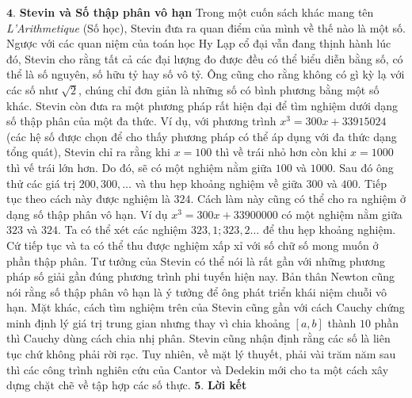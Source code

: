 \begin{multicols}{2}
	\vskip 0.1cm
	$\pmb{4.}$ \textbf{\color{toanhocdoisong}Stevin và Số thập phân vô hạn}
	\vskip 0.1cm
	Trong một cuốn sách khác mang tên \textit{L'Arithmetique} (Số học), Stevin đưa ra quan điểm của mình về thế nào là một số. Ngược với các quan niệm của toán học Hy Lạp cổ đại vẫn đang thịnh hành lúc đó, Stevin cho rằng tất cả các đại lượng đo được đều có thể biểu diễn bằng số, có thể là số nguyên, số hữu tỷ hay số vô tỷ. Ông cũng cho rằng không có gì kỳ lạ với các số như $\sqrt{2}$, chúng chỉ đơn giản là những số có bình phương bằng một số khác. 
	\vskip 0.1cm
	Stevin còn đưa ra một phương pháp rất hiện đại để tìm nghiệm dưới dạng số thập phân của một đa thức. Ví dụ, với phương trình $x^3=300x+33915024$ (các hệ số được chọn để cho thấy phương pháp có thể áp dụng với đa thức dạng tổng quát), Stevin chỉ ra rằng khi $x=100$ thì về trái nhỏ hơn còn khi $x=1000$ thì vế trái lớn hơn. Do đó, sẽ có một nghiệm nằm giữa $100$ và $1000$. Sau đó ông thử các giá trị $200, 300, \ldots$ và thu hẹp khoảng nghiệm về giữa $300$ và $400$. Tiếp tục theo cách này được nghiệm là $324$. Cách làm này cũng có thể cho ra nghiệm ở dạng số thập phân vô hạn. Ví dụ $x^3=300x+33900000$ có một nghiệm nằm giữa $323$ và $324$. Ta có thể xét các nghiệm $323,1; 323,2 \ldots$ để thu hẹp khoảng nghiệm. Cứ tiếp tục và ta có thể thu được nghiệm xấp xỉ với số chữ số mong muốn ở phần thập phân. Tư tưởng của Stevin có thể nói là rất gần với những phương pháp số giải gần đúng phương trình phi tuyến hiện nay.
	\vskip 0.1cm
	Bản thân Newton cũng nói rằng số thập phân vô hạn là ý tưởng để ông phát triển khái niệm chuỗi vô hạn. Mặt khác, cách tìm nghiệm trên của Stevin cũng gần với cách Cauchy chứng minh định lý giá trị trung gian nhưng thay vì chia khoảng $[a,b]$ thành $10$ phần thì Cauchy dùng cách chia nhị phân. Stevin cũng nhận định rằng các số là liên tục chứ không phải rời rạc. Tuy nhiên, về mặt lý thuyết, phải vài trăm năm sau thì các công trình nghiên cứu của Cantor và Dedekin mới cho ta một cách xây dựng chặt chẽ về tập hợp các số thực.
	\vskip 0.1cm
	\vskip 0.1cm
	$\pmb{5.}$ \textbf{\color{toanhocdoisong}Lời kết}
	\vskip 0.1cm

\end{multicols}
